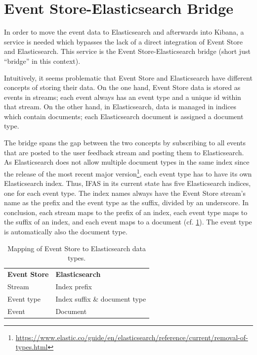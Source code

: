 \section{Event Store-Elasticsearch Bridge}
\label{sec:design:bridge}

In order to move the event data to Elasticsearch and afterwards into Kibana, a service is needed which bypasses the lack of a direct integration of Event Store and Elasticsearch.
This service is the Event Store-Elasticsearch bridge (short just ``bridge'' in this context).


Intuitively, it seems problematic that Event Store and Elasticsearch have different concepts of storing their data.
On the one hand, Event Store data is stored as events in streams; each event always has an event type and a unique id within that stream.
On the other hand, in Elasticsearch, data is managed in indices which contain documents; each Elasticsearch document is assigned a document type.

The bridge spans the gap between the two concepts by subscribing to all events that are posted to the user feedback stream and posting them to Elasticsearch.
As Elasticsearch does not allow multiple document types in the same index since the release of the most recent major version\footnote{\url{https://www.elastic.co/guide/en/elasticsearch/reference/current/removal-of-types.html}}, each event type has to have its own Elasticsearch index.
Thus, \ac{IFAS} in its current state has five Elasticsearch indices, one for each event type.
The index names always have the Event Store stream's name as the prefix and the event type as the suffix, divided by an underscore.
In conclusion, each stream maps to the prefix of an index, each event type maps to the suffix of an index, and each event maps to a document (cf. \cref{table:design:bridge}).
The event type is automatically also the document type.


\begin{table}[]
\centering
\caption{Mapping of Event Store to Elasticsearch data types.}
\label{table:design:bridge}
\begin{tabular}{l|l}
\textbf{Event Store} & \textbf{Elasticsearch} \\ \cline{1-2}
Stream & Index prefix \\
Event type & Index suffix \& document type \\
Event & Document
\end{tabular}
\end{table}

